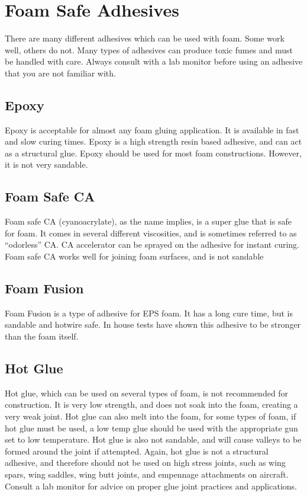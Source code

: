 \section{Foam Safe Adhesives}
There are many different adhesives which can be used with foam.  Some work well, others do not. Many types of adhesives can produce toxic fumes and must be handled with care.  Always consult with a lab monitor before using an adhesive that you are not familiar with.
\subsection{Epoxy}
Epoxy is acceptable for almost any foam gluing application.  It is available in fast and slow curing times.  Epoxy is a high strength resin based adhesive, and can act as a structural glue.  Epoxy should be used for most foam constructions.  However, it is not very sandable.
\subsection{Foam Safe CA}
Foam safe CA (cyanoacrylate), as the name implies, is a super glue that is safe for foam.  It comes in several different viscosities, and is sometimes referred to as “odorless” CA.  CA accelerator can be sprayed on the adhesive for instant curing.  Foam safe CA works well for joining foam surfaces, and is not sandable
\subsection{Foam Fusion}
Foam Fusion is a type of adhesive for EPS foam.  It has a long cure time, but is sandable and hotwire safe.  In house tests have shown this adhesive to be stronger than the foam itself.
\subsection{Hot Glue}
Hot glue, which can be used on several types of foam, is not recommended for construction.  It is very low strength, and does not soak into the foam, creating a very weak joint.  Hot glue can also melt into the foam, for some types of foam, if hot glue must be used, a low temp glue should be used with the appropriate gun set to low temperature.  Hot glue is also not sandable, and will cause valleys to be formed around the joint if attempted.  Again, hot glue is not a structural adhesive, and therefore should not be used on high stress joints, such as wing spars, wing saddles, wing butt joints, and empennage attachments on aircraft.  Consult a lab monitor for advice on proper glue joint practices and applications.
